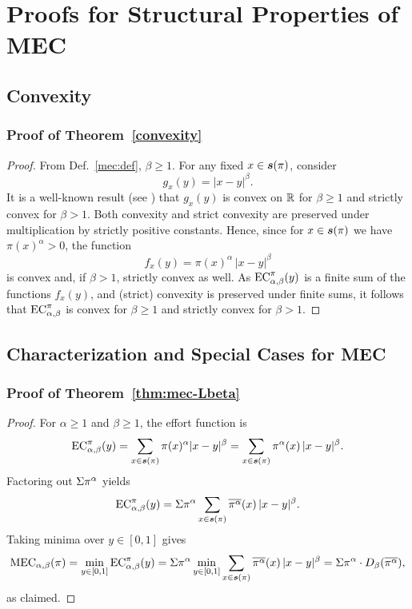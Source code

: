 \section{Proofs for Structural Properties of MEC}
\label{appendix:structural-properties-proofs}

\subsection{Convexity}
\subsubsection{Proof of Theorem~\ref{convexity}}
\label{appendix:proof-convexity}
\convexityThm*
\begin{proof}
From Def.~\ref{mec:def}, \(\beta \geq 1\). For any fixed \(x\in \boldsymbol{s}(\pi)\), consider 
\[
g_x(y)=|x-y|^\beta.
\]
It is a well-known result (see \cite{Rockafellar1970}) that \(g_x(y)\) is convex on \(\mathbb{R}\) for \(\beta\ge1\) and strictly convex for \(\beta>1\). Both convexity and strict convexity are preserved under multiplication by strictly positive constants. Hence, since for \(x\in \boldsymbol{s}(\pi)\) we have \(\pi(x)^\alpha>0\), the function 
\[
f_x(y)=\pi(x)^\alpha\, |x-y|^\beta
\]
is convex and, if \(\beta>1\), strictly convex as well. As \(\EC(y)\) is a finite sum of the functions \(f_x(y)\), and (strict) convexity is preserved under finite sums, it follows that \(\EC\) is convex for \(\beta\ge1\) and strictly convex for \(\beta>1\).
\end{proof}

\subsection{Characterization and Special Cases for MEC}
\subsubsection{Proof of Theorem~\ref{thm:mec-Lbeta}}
\label{appendix:proof-mec-lbeta}
\mecLbeta*
\begin{proof}
For $\alpha\ge 1$ and $\beta\ge 1$, the effort function is
\[
\EC(y)=\sum_{x\in\support(\pi)} \pi(x)^\alpha |x-y|^\beta
=\sum_{x\in\support(\pi)} \pi^\alpha(x)\,|x-y|^\beta.
\]
Factoring out $\Sigma \pi^\alpha$ yields
\[
\EC(y)=\Mass{\pi^\alpha}\sum_{x\in\support(\pi)} \overline{\pi^\alpha}(x)\,|x-y|^\beta.
\]
Taking minima over $y\in[0,1]$ gives
\[
\MEC[\alpha,\beta](\pi)
=\min_{y\in[0,1]}\EC(y)
=\Mass{\pi^\alpha}\min_{y\in[0,1]}\sum_{x\in\support(\pi)} \overline{\pi^\alpha}(x)\,|x-y|^\beta
=\Mass{\pi^\alpha}\cdot D_\beta(\overline{\pi^\alpha}),
\]
as claimed.
\end{proof}

